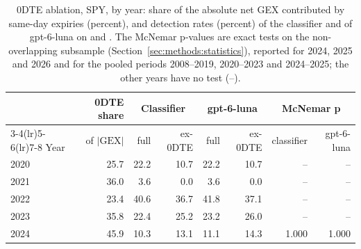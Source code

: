 \begin{table}[H]
\centering
\caption{0DTE ablation, SPY, by year: share of the absolute net GEX contributed by same-day expiries (percent), and detection rates (percent) of the classifier and of gpt-6-luna on  and . The McNemar p-values are exact tests on the non-overlapping subsample (Section~\ref{sec:methods:statistics}), reported for 2024, 2025 and 2026 and for the pooled periods 2008--2019, 2020--2023 and 2024--2025; the other years have no test (--).}
\label{tab:ablation}
\footnotesize
\begin{tabular}{@{}lrrrrrrr@{}}
\toprule
 & 0DTE share & \multicolumn{2}{c}{Classifier} & \multicolumn{2}{c}{gpt-6-luna} & \multicolumn{2}{c}{McNemar p} \\
\cmidrule(lr){3-4}\cmidrule(lr){5-6}\cmidrule(lr){7-8}
Year & of $|\mathrm{GEX}|$ & full & ex-0DTE & full & ex-0DTE & classifier & gpt-6-luna \\
\midrule
2020 & 25.7 & 22.2 & 10.7 & 22.2 & 10.7 & -- & -- \\
2021 & 36.0 & 3.6 & 0.0 & 3.6 & 0.0 & -- & -- \\
2022 & 23.4 & 40.6 & 36.7 & 41.8 & 37.1 & -- & -- \\
2023 & 35.8 & 22.4 & 25.2 & 23.2 & 26.0 & -- & -- \\
2024 & 45.9 & 10.3 & 13.1 & 11.1 & 14.3 & 1.000 & 1.000 \\

\end{tabular}
\end{table}

